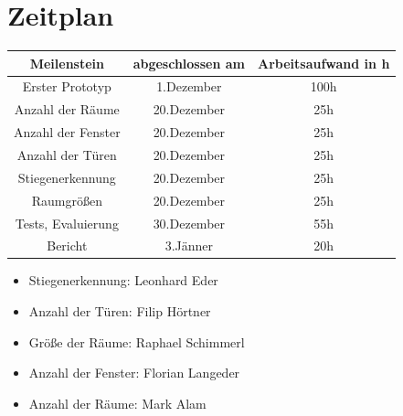\documentclass[deutsch]{scrartcl}
\begin{document}
\section{Zeitplan}
\begin{table}[h!]
	\centering
		\begin{tabular}{|c|c|c|}
		\hline
		Meilenstein & abgeschlossen am & Arbeitsaufwand in h\\
		\hline
		Erster Prototyp & 1.Dezember & 100h\\
		Anzahl der Räume & 20.Dezember & 25h\\
		Anzahl der Fenster & 20.Dezember & 25h\\
		Anzahl der Türen & 20.Dezember & 25h\\
		Stiegenerkennung & 20.Dezember & 25h\\
		Raumgrößen & 20.Dezember & 25h\\
		Tests, Evaluierung & 30.Dezember & 55h\\
		Bericht & 3.Jänner & 20h\\
		\hline
		\end{tabular}
\end{table}
\begin{itemize}
	\item Stiegenerkennung: Leonhard Eder \cite{Dosch2000}
	\item Anzahl der Türen: Filip Hörtner \cite{TUW-274401}
	\item Größe der Räume: Raphael Schimmerl \cite{jang18}
	\item Anzahl der Fenster: Florian Langeder \cite{or2005highly}
	\item Anzahl der Räume: Mark Alam \cite{vargas18}
	
\end{itemize}
\end{document}
